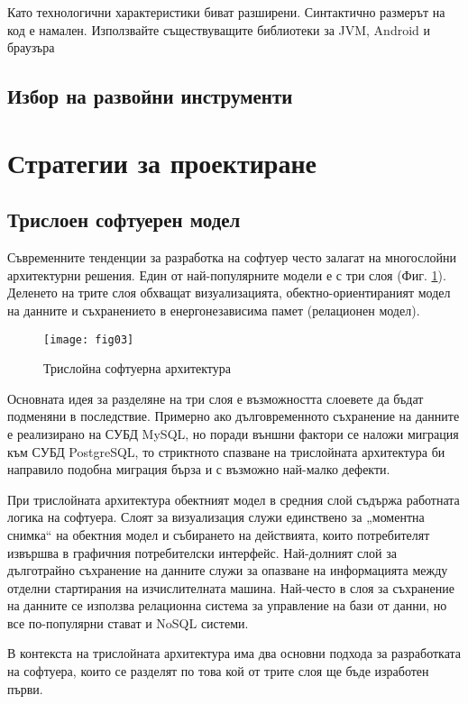Като технологични характеристики биват разширени. Синтактично размерът на код е намален. Използвайте съществуващите библиотеки за JVM, Android и браузъра

\subsection{Избор на развойни инструменти}

\section{Стратегии за проектиране}

\subsection{Трислоен софтуерен модел}

Съвременните тенденции за разработка на софтуер често залагат на многослойни архитектурни решения. Един от най-популярните модели е с три слоя (Фиг. \ref{figure03}). Деленето на трите слоя обхващат визуализацията, обектно-ориентираният модел на данните и съхранението в енергонезависима памет (релационен модел). 

\begin{figure}[h!]
 \centering
 \texttt{[image: fig03]}
 \caption{Трислойна софтуерна архитектура}
\label{figure03}
\end{figure}
\FloatBarrier

Основната идея за разделяне на три слоя е възможността слоевете да бъдат подменяни в последствие. Примерно ако дълговременното съхранение на данните е реализирано на СУБД MySQL, но поради външни фактори се наложи миграция към СУБД PostgreSQL, то стриктното спазване на трислойната архитектура би направило подобна миграция бърза и с възможно най-малко дефекти. 

При трислойната архитектура обектният модел в средния слой съдържа работната логика на софтуера. Слоят за визуализация служи единствено за „моментна снимка“ на обектния модел и събирането на действията, които потребителят извършва в графичния потребителски интерфейс. Най-долният слой за дълготрайно съхранение на данните служи за опазване на информацията между отделни стартирания на изчислителната машина. Най-често в слоя за съхранение на данните се използва релационна система за управление на бази от данни, но все по-популярни стават и NoSQL системи. 

В контекста на трислойната архитектура има два основни подхода за разработката на софтуера, които се разделят по това кой от трите слоя ще бъде изработен първи. 

